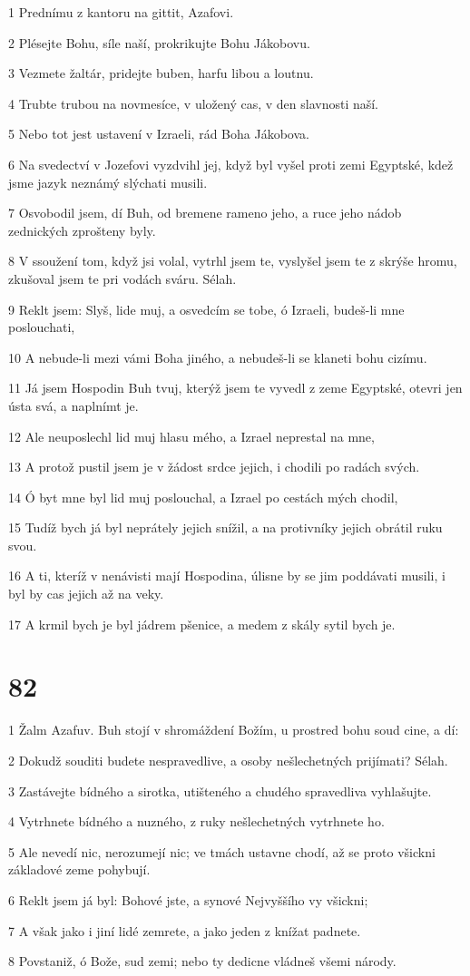 \par 1 Prednímu z kantoru na gittit, Azafovi.
\par 2 Plésejte Bohu, síle naší, prokrikujte Bohu Jákobovu.
\par 3 Vezmete žaltár, pridejte buben, harfu libou a loutnu.
\par 4 Trubte trubou na novmesíce, v uložený cas, v den slavnosti naší.
\par 5 Nebo tot jest ustavení v Izraeli, rád Boha Jákobova.
\par 6 Na svedectví v Jozefovi vyzdvihl jej, když byl vyšel proti zemi Egyptské, kdež jsme jazyk neznámý slýchati musili.
\par 7 Osvobodil jsem, dí Buh, od bremene rameno jeho, a ruce jeho nádob zednických zprošteny byly.
\par 8 V ssoužení tom, když jsi volal, vytrhl jsem te, vyslyšel jsem te z skrýše hromu, zkušoval jsem te pri vodách sváru. Sélah.
\par 9 Reklt jsem: Slyš, lide muj, a osvedcím se tobe, ó Izraeli, budeš-li mne poslouchati,
\par 10 A nebude-li mezi vámi Boha jiného, a nebudeš-li se klaneti bohu cizímu.
\par 11 Já jsem Hospodin Buh tvuj, kterýž jsem te vyvedl z zeme Egyptské, otevri jen ústa svá, a naplnímt je.
\par 12 Ale neuposlechl lid muj hlasu mého, a Izrael neprestal na mne,
\par 13 A protož pustil jsem je v žádost srdce jejich, i chodili po radách svých.
\par 14 Ó byt mne byl lid muj poslouchal, a Izrael po cestách mých chodil,
\par 15 Tudíž bych já byl neprátely jejich snížil, a na protivníky jejich obrátil ruku svou.
\par 16 A ti, kteríž v nenávisti mají Hospodina, úlisne by se jim poddávati musili, i byl by cas jejich až na veky.
\par 17 A krmil bych je byl jádrem pšenice, a medem z skály sytil bych je.

\chapter{82}

\par 1 Žalm Azafuv. Buh stojí v shromáždení Božím, u prostred bohu soud cine, a dí:
\par 2 Dokudž souditi budete nespravedlive, a osoby nešlechetných prijímati? Sélah.
\par 3 Zastávejte bídného a sirotka, utišteného a chudého spravedliva vyhlašujte.
\par 4 Vytrhnete bídného a nuzného, z ruky nešlechetných vytrhnete ho.
\par 5 Ale nevedí nic, nerozumejí nic; ve tmách ustavne chodí, až se proto všickni základové zeme pohybují.
\par 6 Reklt jsem já byl: Bohové jste, a synové Nejvyššího vy všickni;
\par 7 A však jako i jiní lidé zemrete, a jako jeden z knížat padnete.
\par 8 Povstaniž, ó Bože, sud zemi; nebo ty dedicne vládneš všemi národy.

